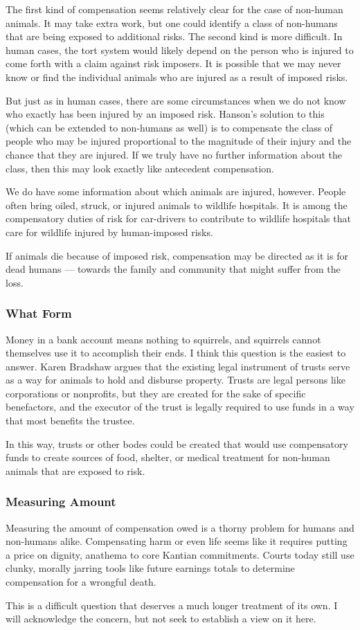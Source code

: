 The first kind of compensation seems relatively clear for the case of non-human
animals. It may take extra work, but one could identify a class of non-humans
that are being exposed to additional risks. The second kind is more difficult.
In human cases, the tort system would likely depend on the person who is
injured to come forth with a claim against risk imposers. It is possible that
we may never know or find the individual animals who are injured as a result of
imposed risks.

But just as in human cases, there are some circumstances when we do not know
who exactly has been injured by an imposed risk. Hanson’s solution to this
(which can be extended to non-humans as well) is to compensate the class of
people who may be injured proportional to the magnitude of their injury and the
chance that they are injured. If we truly have no further information about the
class, then this may look exactly like antecedent compensation.

We do have some information about which animals are injured, however. People
often bring oiled, struck, or injured animals to wildlife hospitals. It is
among the compensatory duties of risk for car-drivers to contribute to wildlife
hospitals that care for wildlife injured by human-imposed risks.

If animals die because of imposed risk, compensation may be directed as it is
for dead humans --- towards the family and community that might suffer from the
loss.

\subsubsection{What Form}

Money in a bank account means nothing to squirrels, and squirrels cannot
themselves use it to accomplish their ends. I think this question is the
easiest to answer. Karen Bradshaw argues that the existing legal instrument of
trusts serve as a way for animals to hold and disburse property. Trusts are
legal persons like corporations or nonprofits, but they are created for the
sake of specific benefactors, and the executor of the trust is legally required
to use funds in a way that most benefits the trustee.

In this way, trusts or other bodes could be created that would use compensatory
funds to create sources of food, shelter, or medical treatment for non-human
animals that are exposed to risk.

\subsubsection{Measuring Amount}

Measuring the amount of compensation owed is a thorny problem for humans and
non-humans alike.  Compensating harm or even life seems like it requires
putting a price on dignity, anathema to core Kantian commitments.  Courts today
still use clunky, morally jarring tools like future earnings totals to
determine compensation for a wrongful death.

This is a difficult question that deserves a much longer treatment of its own.
I will acknowledge the concern, but not seek to establish a view on it here.
